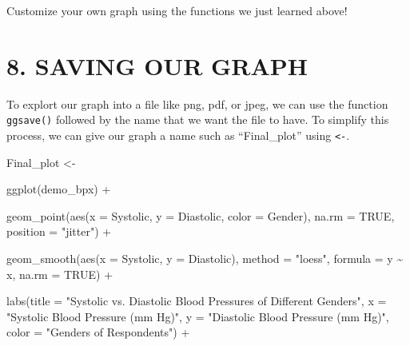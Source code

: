 \documentclass[
]{book}
\newenvironment{Shaded}{\begin{snugshade}}{\end{snugshade}}
\newcommand{\AttributeTok}[1]{\textcolor[rgb]{0.77,0.63,0.00}{#1}}
\newcommand{\ConstantTok}[1]{\textcolor[rgb]{0.00,0.00,0.00}{#1}}
\newcommand{\FunctionTok}[1]{\textcolor[rgb]{0.00,0.00,0.00}{#1}}
\newcommand{\NormalTok}[1]{#1}
\newcommand{\OtherTok}[1]{\textcolor[rgb]{0.56,0.35,0.01}{#1}}
\newcommand{\SpecialCharTok}[1]{\textcolor[rgb]{0.00,0.00,0.00}{#1}}
\newcommand{\StringTok}[1]{\textcolor[rgb]{0.31,0.60,0.02}{#1}}
\begin{document}
Customize your own graph using the functions we just learned above!

\hypertarget{saving-our-graph}{%
\section{8. SAVING OUR GRAPH}\label{saving-our-graph}}

To explort our graph into a file like png, pdf, or jpeg, we can use the function \texttt{ggsave()} followed by the name that we want the file to have. To simplify this process, we can give our graph a name such as ``Final\_plot'' using \texttt{\textless{}-}.

\begin{Shaded}
\begin{Highlighting}[]
\NormalTok{Final\_plot }\OtherTok{\textless{}{-}} 

    \FunctionTok{ggplot}\NormalTok{(demo\_bpx) }\SpecialCharTok{+}

    \FunctionTok{geom\_point}\NormalTok{(}\FunctionTok{aes}\NormalTok{(}\AttributeTok{x =}\NormalTok{ Systolic, }\AttributeTok{y =}\NormalTok{ Diastolic, }\AttributeTok{color =}\NormalTok{ Gender), }
             \AttributeTok{na.rm =} \ConstantTok{TRUE}\NormalTok{,}
             \AttributeTok{position =} \StringTok{"jitter"}\NormalTok{) }\SpecialCharTok{+}
    
    \FunctionTok{geom\_smooth}\NormalTok{(}\FunctionTok{aes}\NormalTok{(}\AttributeTok{x =}\NormalTok{ Systolic, }\AttributeTok{y =}\NormalTok{ Diastolic), }
                \AttributeTok{method =} \StringTok{"loess"}\NormalTok{,}
                \AttributeTok{formula =}\NormalTok{ y }\SpecialCharTok{\textasciitilde{}}\NormalTok{ x,}
                \AttributeTok{na.rm =} \ConstantTok{TRUE}\NormalTok{) }\SpecialCharTok{+} 
    
    \FunctionTok{labs}\NormalTok{(}\AttributeTok{title =} \StringTok{"Systolic vs. Diastolic Blood Pressures of Different Genders"}\NormalTok{,}
         \AttributeTok{x =} \StringTok{"Systolic Blood Pressure (mm Hg)"}\NormalTok{, }
         \AttributeTok{y =} \StringTok{"Diastolic Blood Pressure (mm Hg)"}\NormalTok{,}
         \AttributeTok{color =} \StringTok{"Genders of Respondents"}\NormalTok{) }\SpecialCharTok{+}


\end{Highlighting}
\end{Shaded}
\end{document}
